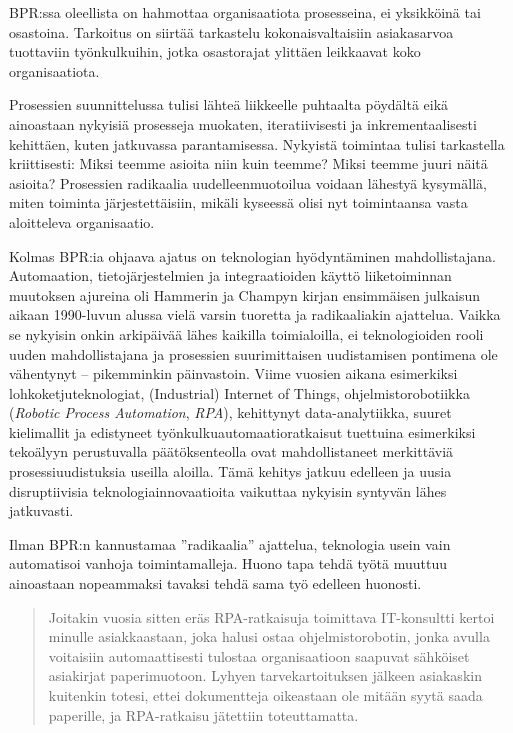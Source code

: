 \documentclass[
  finnish,
  letterpaper,
  DIV=11,
  numbers=noendperiod,
  oneside]{scrreprt}
\begin{document}
BPR:ssa oleellista on hahmottaa organisaatiota prosesseina, ei
yksikköinä tai osastoina. Tarkoitus on siirtää tarkastelu
kokonaisvaltaisiin asiakasarvoa tuottaviin työnkulkuihin, jotka
osastorajat ylittäen leikkaavat koko organisaatiota.

Prosessien suunnittelussa tulisi lähteä liikkeelle puhtaalta pöydältä
eikä ainoastaan nykyisiä prosesseja muokaten, iteratiivisesti ja
inkrementaalisesti kehittäen, kuten jatkuvassa parantamisessa. Nykyistä
toimintaa tulisi tarkastella kriittisesti: Miksi teemme asioita niin
kuin teemme? Miksi teemme juuri näitä asioita? Prosessien radikaalia
uudelleenmuotoilua voidaan lähestyä kysymällä, miten toiminta
järjestettäisiin, mikäli kyseessä olisi nyt toimintaansa vasta
aloitteleva organisaatio.

Kolmas BPR:ia ohjaava ajatus on teknologian hyödyntäminen
mahdollistajana. Automaation, tietojärjestelmien ja integraatioiden
käyttö liiketoiminnan muutoksen ajureina oli Hammerin ja Champyn kirjan
ensimmäisen julkaisun aikaan 1990-luvun alussa vielä varsin tuoretta ja
radikaaliakin ajattelua. Vaikka se nykyisin onkin arkipäivää lähes
kaikilla toimialoilla, ei teknologioiden rooli uuden mahdollistajana ja
prosessien suurimittaisen uudistamisen pontimena ole vähentynyt --
pikemminkin päinvastoin. Viime vuosien aikana esimerkiksi
lohkoketjuteknologiat, (Industrial) Internet of Things,
ohjelmistorobotiikka (\emph{Robotic Process Automation}, \emph{RPA}),
kehittynyt data-analytiikka, suuret kielimallit ja edistyneet
työnkulkuautomaatioratkaisut tuettuina esimerkiksi tekoälyyn
perustuvalla päätöksenteolla ovat mahdollistaneet merkittäviä
prosessiuudistuksia useilla aloilla. Tämä kehitys jatkuu edelleen ja
uusia disruptiivisia teknologiainnovaatioita vaikuttaa nykyisin syntyvän
lähes jatkuvasti.

Ilman BPR:n kannustamaa ''radikaalia'' ajattelua, teknologia usein vain
automatisoi vanhoja toimintamalleja. Huono tapa tehdä työtä muuttuu
ainoastaan nopeammaksi tavaksi tehdä sama työ edelleen huonosti.

\begin{quote}
Joitakin vuosia sitten eräs RPA-ratkaisuja toimittava IT-konsultti
kertoi minulle asiakkaastaan, joka halusi ostaa ohjelmistorobotin, jonka
avulla voitaisiin automaattisesti tulostaa organisaatioon saapuvat
sähköiset asiakirjat paperimuotoon. Lyhyen tarvekartoituksen jälkeen
asiakaskin kuitenkin totesi, ettei dokumentteja oikeastaan ole mitään
syytä saada paperille, ja RPA-ratkaisu jätettiin toteuttamatta.
\end{quote}
\end{document}
